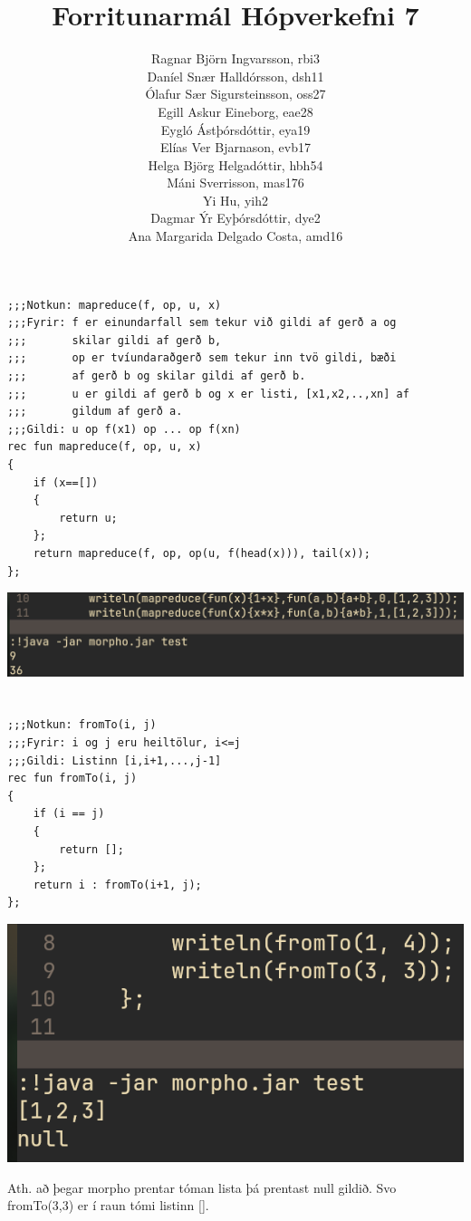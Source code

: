 \documentclass{article}
\title{Forritunarmál Hópverkefni 7}
\author{Ragnar Björn Ingvarsson, rbi3 \\
		Daníel Snær Halldórsson, dsh11 \\
		Ólafur Sær Sigursteinsson, oss27 \\
		Egill Askur Eineborg, eae28 \\
		Eygló Ástþórsdóttir, eya19 \\
		Elías Ver Bjarnason, evb17 \\
		Helga Björg Helgadóttir, hbh54 \\
		Máni Sverrisson, mas176 \\
		Yi Hu, yih2 \\
		Dagmar Ýr Eyþórsdóttir, dye2 \\
		Ana Margarida Delgado Costa, amd16}
\begin{document}
\renewcommand\thepage{}
	
	\maketitle

	\newpage
	\setcounter{page}{1}
	\renewcommand\thepage{\arabic{page}}

	\section{}
	\begin{verbatim}
;;;Notkun: mapreduce(f, op, u, x)
;;;Fyrir: f er einundarfall sem tekur við gildi af gerð a og
;;;       skilar gildi af gerð b, 
;;;       op er tvíundaraðgerð sem tekur inn tvö gildi, bæði
;;;       af gerð b og skilar gildi af gerð b.
;;;       u er gildi af gerð b og x er listi, [x1,x2,..,xn] af 
;;;       gildum af gerð a.
;;;Gildi: u op f(x1) op ... op f(xn) 
rec fun mapreduce(f, op, u, x)
{
    if (x==[])
    {
        return u;
    };
    return mapreduce(f, op, op(u, f(head(x))), tail(x));
};
	\end{verbatim}
	\begin{center}
		\includegraphics[scale=0.35]{mapreduce.png}
	\end{center}
	
	\newpage
	\section{}
	\begin{verbatim}
;;;Notkun: fromTo(i, j)
;;;Fyrir: i og j eru heiltölur, i<=j
;;;Gildi: Listinn [i,i+1,...,j-1]
rec fun fromTo(i, j)
{
    if (i == j)
    {
        return [];
    };
    return i : fromTo(i+1, j);
};
	\end{verbatim}
	\begin{center}
		\includegraphics[scale=0.35]{fromto.png}
	\end{center}
	Ath. að þegar morpho prentar tóman lista þá prentast null gildið. Svo 
	fromTo(3,3) er í raun tómi listinn [].
\end{document}
